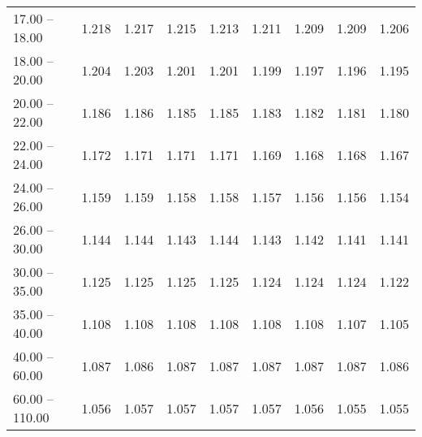 \begin{table}[htp]
\begin{tiny}
\begin{center}
\begin{tabular}{|l|c|c|c|c|c|c|c|c|}
      17.00 -- 18.00 &  1.218 & 1.217 & 1.215 & 1.213 & 1.211 & 1.209 & 1.209 & 1.206 \\ 
      18.00 -- 20.00 &  1.204 & 1.203 & 1.201 & 1.201 & 1.199 & 1.197 & 1.196 & 1.195 \\ 
      20.00 -- 22.00 &  1.186 & 1.186 & 1.185 & 1.185 & 1.183 & 1.182 & 1.181 & 1.180 \\ 
      22.00 -- 24.00 &  1.172 & 1.171 & 1.171 & 1.171 & 1.169 & 1.168 & 1.168 & 1.167 \\ 
      24.00 -- 26.00 &  1.159 & 1.159 & 1.158 & 1.158 & 1.157 & 1.156 & 1.156 & 1.154 \\ 
      26.00 -- 30.00 &  1.144 & 1.144 & 1.143 & 1.144 & 1.143 & 1.142 & 1.141 & 1.141 \\ 
      30.00 -- 35.00 &  1.125 & 1.125 & 1.125 & 1.125 & 1.124 & 1.124 & 1.124 & 1.122 \\ 
      35.00 -- 40.00 &  1.108 & 1.108 & 1.108 & 1.108 & 1.108 & 1.108 & 1.107 & 1.105 \\ 
      40.00 -- 60.00 &  1.087 & 1.086 & 1.087 & 1.087 & 1.087 & 1.087 & 1.087 & 1.086 \\ 
      60.00 -- 110.00 &  1.056 & 1.057 & 1.057 & 1.057 & 1.057 & 1.056 & 1.055 & 1.055 \\ 
\hline
\end{tabular} 
             \end{center} 
             \end{tiny} 
             \label{tab:sa_trp0_jpsi8} 
             \end{table}


